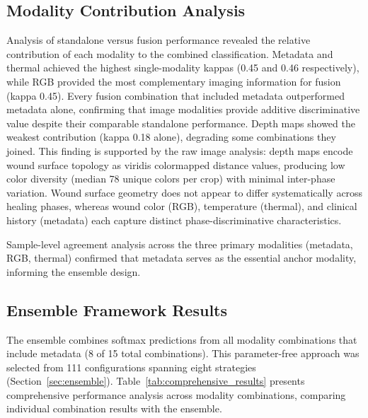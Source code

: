 \documentclass[journal,twoside,web]{ieeecolor}
\begin{document}
\subsection{Modality Contribution Analysis}
Analysis of standalone versus fusion performance revealed the relative contribution of each modality to the combined classification. Metadata and thermal achieved the highest single\nobreakdash-modality kappas (0.45 and 0.46 respectively), while RGB provided the most complementary imaging information for fusion (kappa 0.45). Every fusion combination that included metadata outperformed metadata alone, confirming that image modalities provide additive discriminative value despite their comparable standalone performance. Depth maps showed the weakest contribution (kappa 0.18 alone), degrading some combinations they joined. This finding is supported by the raw image analysis: depth maps encode wound surface topology as viridis colormapped distance values, producing low color diversity (median 78 unique colors per crop) with minimal inter-phase variation. Wound surface geometry does not appear to differ systematically across healing phases, whereas wound color (RGB), temperature (thermal), and clinical history (metadata) each capture distinct phase-discriminative characteristics.

Sample\nobreakdash-level agreement analysis across the three primary modalities (metadata, RGB, thermal) confirmed that metadata serves as the essential anchor modality, informing the ensemble design.

\subsection{Ensemble Framework Results}
The ensemble combines softmax predictions from all modality combinations that include metadata (8 of 15 total combinations). This parameter\nobreakdash-free approach was selected from 111 configurations spanning eight strategies (Section~\ref{sec:ensemble}). Table~\ref{tab:comprehensive_results} presents comprehensive performance analysis across modality combinations, comparing individual combination results with the ensemble.
\end{document}
